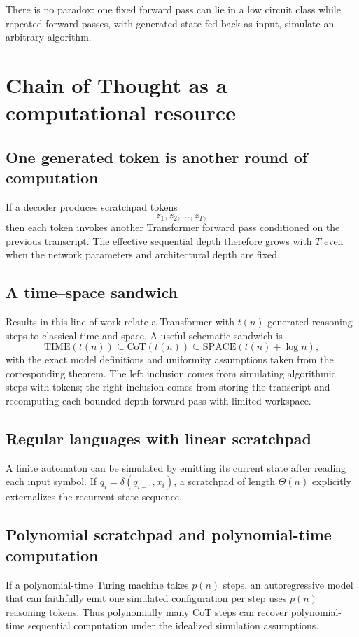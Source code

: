 \documentclass[11pt,a4paper,oneside,openany]{memoir}
\theoremstyle{definition}
\begin{document}
\begin{presentbox}
There is no paradox: one fixed forward pass can lie in a low circuit class while repeated forward passes, with generated state fed back as input, simulate an arbitrary algorithm.
\end{presentbox}

\chapter{Chain of Thought as a computational resource}
\section{One generated token is another round of computation}
If a decoder produces scratchpad tokens
\[
z_1,z_2,\ldots,z_T,
\]
then each token invokes another Transformer forward pass conditioned on the previous transcript.  The effective sequential depth therefore grows with $T$ even when the network parameters and architectural depth are fixed.

\section{A time--space sandwich}
Results in this line of work relate a Transformer with $t(n)$ generated reasoning steps to classical time and space.  A useful schematic sandwich is
\[
\mathrm{TIME}(t(n))
\subseteq
\mathrm{CoT}(t(n))
\subseteq
\mathrm{SPACE}(t(n)+\log n),
\]
with the exact model definitions and uniformity assumptions taken from the corresponding theorem.  The left inclusion comes from simulating algorithmic steps with tokens; the right inclusion comes from storing the transcript and recomputing each bounded-depth forward pass with limited workspace.

\section{Regular languages with linear scratchpad}
A finite automaton can be simulated by emitting its current state after reading each input symbol.  If $q_i=\delta(q_{i-1},x_i)$, a scratchpad of length $\Theta(n)$ explicitly externalizes the recurrent state sequence.

\section{Polynomial scratchpad and polynomial-time computation}
If a polynomial-time Turing machine takes $p(n)$ steps, an autoregressive model that can faithfully emit one simulated configuration per step uses $p(n)$ reasoning tokens.  Thus polynomially many CoT steps can recover polynomial-time sequential computation under the idealized simulation assumptions.
\end{document}
